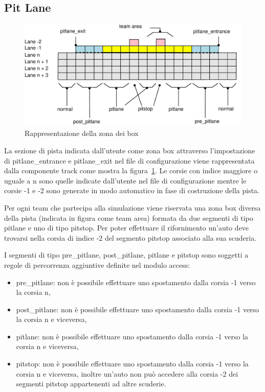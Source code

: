 \documentclass[11pt,a4paper]{report}
\begin{document}
\subsection{Pit Lane}
\begin{center}
\begin{figure}
\includegraphics[width=\textwidth]{diagrammi/PitLane}
\caption{Rappresentazione della zona dei box}
\label{fig:pitLane}
\end{figure}
\end{center}

La sezione di pista indicata dall'utente come zona box attraverso l'impostazione di pitlane\_entrance e pitlane\_exit nel file di configurazione viene rappresentata dalla componente track come mostra la figura~\ref{fig:pitLane}. Le corsie con indice maggiore o uguale a n sono quelle indicate dall'utente nel file di configurazione mentre le corsie -1 e -2 sono generate in modo automatico in fase di costruzione della pista.

Per ogni team che partecipa alla simulazione viene riservata una zona box diversa della pista (indicata in figura come team area) formata da due segmenti di tipo pitlane e uno di tipo pitstop. Per poter effettuare il rifornimento un'auto deve trovarsi nella corsia di indice -2 del segmento pitstop associato alla sua scuderia.

I segmenti di tipo pre\_pitlane, post\_pitlane, pitlane e pitstop sono soggetti a regole di percorrenza aggiuntive definite nel modulo access:
\begin{itemize}
\item pre\_pitlane: non è possibile effettuare uno spostamento dalla corsia -1 verso la corsia n,
\item post\_pitlane: non è possibile effettuare uno spostamento dalla corsia -1 verso la corsia n e viceversa,
\item pitlane: non è possibile effettuare uno spostamento dalla corsia -1 verso la corsia n e viceversa,
\item pitstop: non è possibile effettuare uno spostamento dalla corsia -1 verso la corsia n e viceversa, inoltre un'auto non può accedere alla corsia -2 dei segmenti pitstop appartenenti ad altre scuderie.
\end{itemize}
\end{document}
